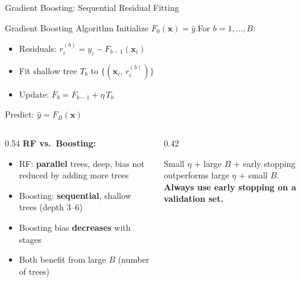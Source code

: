 \documentclass[aspectratio=169, 10pt]{beamer}
\begin{document}
\begin{frame}{Gradient Boosting: Sequential Residual Fitting}
  \begin{definitionbox}{Gradient Boosting Algorithm}
    \footnotesize
    Initialize $F_0(\mathbf{x}) = \bar{y}$.\quad For $b = 1, \ldots, B$:
    \begin{itemize}
      \item Residuals: $r_i^{(b)} = y_i - F_{b-1}(\mathbf{x}_i)$
      \item Fit shallow tree $T_b$ to $\{(\mathbf{x}_i,\, r_i^{(b)})\}$
      \item Update: $F_b = F_{b-1} + \eta\, T_b$
    \end{itemize}
    Predict: $\hat{y} = F_B(\mathbf{x})$
  \end{definitionbox}

  \begin{columns}[T]
    \begin{column}{0.54\textwidth}
      \textbf{RF vs.\ Boosting:}
      \begin{itemize}
        \item RF: \textbf{parallel} trees, deep, bias not reduced by adding more trees
        \item Boosting: \textbf{sequential}, shallow trees (depth 3--6)
        \item Boosting bias \textbf{decreases} with stages
        \item Both benefit from large $B$ (number of trees)
      \end{itemize}
    \end{column}
    \begin{column}{0.42\textwidth}
      \begin{warningbox}
        Small $\eta$ + large $B$ + early stopping
        outperforms large $\eta$ + small $B$.\\[2pt]
        \textbf{Always use early stopping on a validation set.}
      \end{warningbox}
    \end{column}
  \end{columns}
\end{frame}
\end{document}
